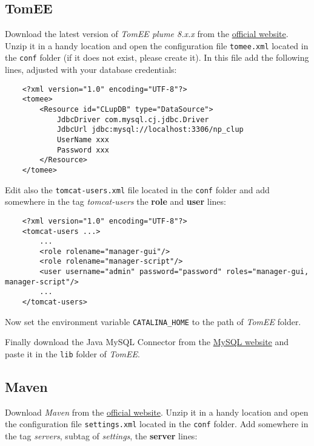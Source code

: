 \subsection{TomEE}
Download the latest version of \textit{TomEE plume 8.x.x} from the \href{https://tomee.apache.org/download-ng.html/}{official website}.\newline
Unzip it in a handy location and open the configuration file \verb|tomee.xml| located in the \verb|conf| folder (if it does not exist, please create it).\newline
In this file add the following lines, adjusted with your database credentials:


\begin{lstlisting}
	<?xml version="1.0" encoding="UTF-8"?>
	<tomee>
		<Resource id="CLupDB" type="DataSource">
			JdbcDriver com.mysql.cj.jdbc.Driver
			JdbcUrl jdbc:mysql://localhost:3306/np_clup
			UserName xxx
			Password xxx
		</Resource>
	</tomee>
\end{lstlisting}

Edit also the \verb|tomcat-users.xml| file located in the \verb|conf| folder and add somewhere in the tag \textit{tomcat-users} the \textbf{role} and \textbf{user} lines:

\begin{lstlisting}
	<?xml version="1.0" encoding="UTF-8"?>
	<tomcat-users ...>
		...
		<role rolename="manager-gui"/>
		<role rolename="manager-script"/>
		<user username="admin" password="password" roles="manager-gui, manager-script"/>
		...
	</tomcat-users>
\end{lstlisting}

Now set the environment variable \verb|CATALINA_HOME| to the path of \textit{TomEE} folder.

Finally download the Java MySQL Connector from the \href{https://dev.mysql.com/downloads/connector/j/}{MySQL website} and paste it in the \verb|lib| folder of \textit{TomEE}.

\subsection{Maven}
Download \textit{Maven} from the \href{https://maven.apache.org/download.cgi}{official website}.\newline
Unzip it in a handy location and open the configuration file \verb|settings.xml| located in the \verb|conf| folder.
Add somewhere in the tag \textit{servers}, subtag of \textit{settings}, the \textbf{server} lines:

